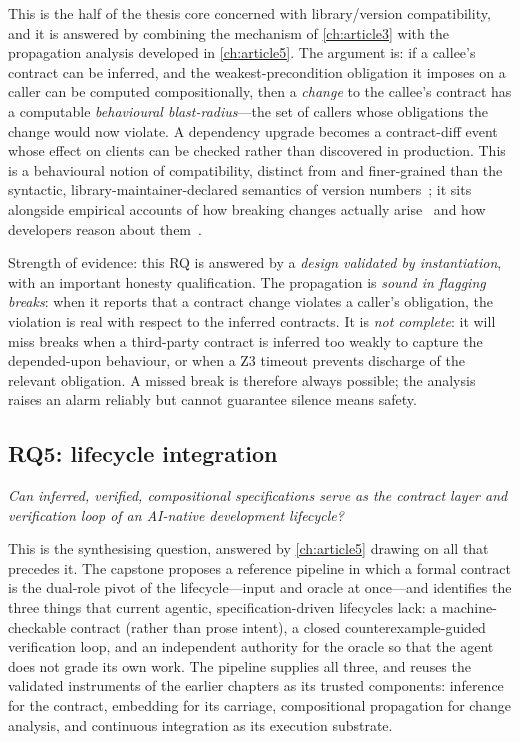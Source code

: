 This is the half of the thesis core concerned with library/version compatibility,
and it is answered by combining the mechanism of \cref{ch:article3} with the
propagation analysis developed in \cref{ch:article5}. The argument is: if a
callee's contract can be inferred, and the weakest-precondition obligation it
imposes on a caller can be computed compositionally, then a \emph{change} to the
callee's contract has a computable \emph{behavioural blast-radius}---the set of
callers whose obligations the change would now violate. A dependency upgrade
becomes a contract-diff event whose effect on clients can be checked rather than
discovered in production. This is a behavioural notion of compatibility, distinct
from and finer-grained than the syntactic, library-maintainer-declared semantics
of version numbers~\citep{preston2013semver}; it sits alongside empirical accounts
of how breaking changes actually arise~\citep{ochoa2022breaking,mostafa2017behavioral}
and how developers reason about them~\citep{jayasuriya2024understanding}.

Strength of evidence: this RQ is answered by a \emph{design validated by
instantiation}, with an important honesty qualification. The propagation is
\emph{sound in flagging breaks}: when it reports that a contract change violates a
caller's obligation, the violation is real with respect to the inferred contracts.
It is \emph{not complete}: it will miss breaks when a third-party contract is
inferred too weakly to capture the depended-upon behaviour, or when a Z3 timeout
prevents discharge of the relevant obligation. A missed break is therefore always
possible; the analysis raises an alarm reliably but cannot guarantee silence means
safety.

\subsection{RQ5: lifecycle integration}

\emph{Can inferred, verified, compositional specifications serve as the contract
layer and verification loop of an AI-native development lifecycle?}

This is the synthesising question, answered by \cref{ch:article5} drawing on all
that precedes it. The capstone proposes a reference pipeline in which a formal
contract is the dual-role pivot of the lifecycle---input and oracle at once---and
identifies the three things that current agentic, specification-driven lifecycles
lack: a machine-checkable contract (rather than prose intent), a closed
counterexample-guided verification loop, and an independent authority for the
oracle so that the agent does not grade its own work. The pipeline supplies all
three, and reuses the validated instruments of the earlier chapters as its trusted
components: inference for the contract, embedding for its carriage, compositional
propagation for change analysis, and continuous integration as its execution
substrate.


